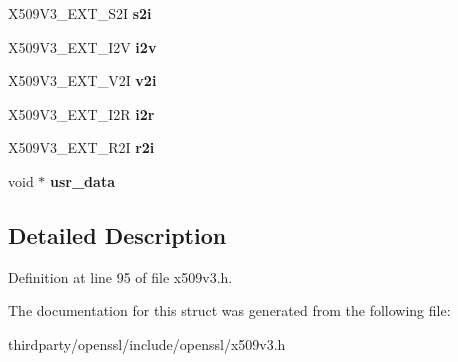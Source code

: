 \begin{DoxyCompactItemize}
X509\+V3\+\_\+\+E\+X\+T\+\_\+\+S2I {\bfseries s2i}
\item 
\mbox{\label{structv3__ext__method_a93b334b99719e183e3d16ea9c7c2547c}} 
X509\+V3\+\_\+\+E\+X\+T\+\_\+\+I2V {\bfseries i2v}
\item 
\mbox{\label{structv3__ext__method_ab0699c47258c61200f7189fe888f7aab}} 
X509\+V3\+\_\+\+E\+X\+T\+\_\+\+V2I {\bfseries v2i}
\item 
\mbox{\label{structv3__ext__method_aa61cb3a7c7bfe70f813857485e9a4e02}} 
X509\+V3\+\_\+\+E\+X\+T\+\_\+\+I2R {\bfseries i2r}
\item 
\mbox{\label{structv3__ext__method_a58e1a54a66185f358d7859e771a9a39a}} 
X509\+V3\+\_\+\+E\+X\+T\+\_\+\+R2I {\bfseries r2i}
\item 
\mbox{\label{structv3__ext__method_a9a1b284354290f1f8d5d375a194c75e6}} 
void $\ast$ {\bfseries usr\+\_\+data}
\end{DoxyCompactItemize}


\subsection{Detailed Description}


Definition at line 95 of file x509v3.\+h.



The documentation for this struct was generated from the following file\+:\begin{DoxyCompactItemize}
\item 
thirdparty/openssl/include/openssl/x509v3.\+h\end{DoxyCompactItemize}
